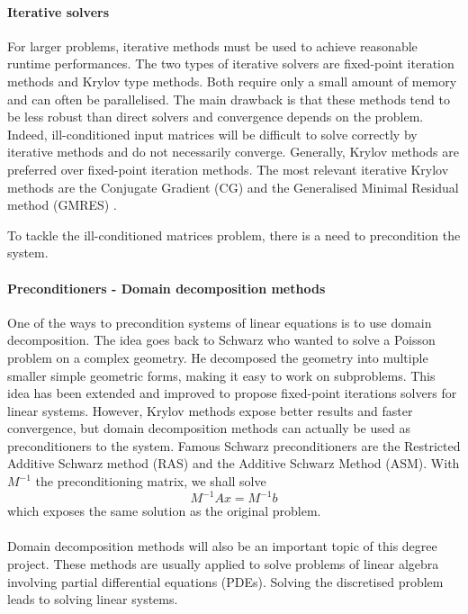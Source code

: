 \paragraph{Iterative solvers}
For larger problems, iterative methods must be used to achieve reasonable runtime performances.
The two types of iterative solvers are fixed-point iteration methods and Krylov type methods.
Both require only a small amount of memory and can often be parallelised.
The main drawback is that these methods tend to be less robust than direct solvers and convergence depends on the problem.
Indeed, ill-conditioned input matrices will be difficult to solve correctly by iterative methods and do not necessarily converge.
Generally, Krylov methods are preferred over fixed-point iteration methods.
The most relevant iterative Krylov methods are the Conjugate Gradient (CG) and the Generalised Minimal Residual method (GMRES) \cite{saad_iterative_2003} \cite{saad_gmres_1986}.

To tackle the ill-conditioned matrices problem, there is a need to precondition the system.


\paragraph{Preconditioners - Domain decomposition methods}
One of the ways to precondition systems of linear equations is to use domain decomposition.
The idea goes back to Schwarz who wanted to solve a Poisson problem on a complex geometry.
He decomposed the geometry into multiple smaller simple geometric forms, making it easy to work on subproblems.
This idea has been extended and improved to propose fixed-point iterations solvers for linear systems.
However, Krylov methods expose better results and faster convergence, but domain decomposition methods can actually be used as preconditioners to the system.
Famous Schwarz preconditioners are the Restricted Additive Schwarz method (RAS) and the Additive Schwarz Method (ASM).
With \(M^{-1}\) the preconditioning matrix, we shall solve
\[M^{-1}Ax = M^{-1}b\]
which exposes the same solution as the original problem.

\paragraph{}
Domain decomposition methods will also be an important topic of this degree project.
These methods are usually applied to solve problems of linear algebra involving partial differential equations (PDEs).
Solving the discretised problem leads to solving linear systems.

